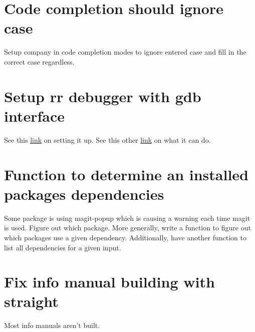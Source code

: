 \documentclass{default}
\begin{document}
\section{Code completion should ignore case}

Setup company in code completion modes to ignore entered case and fill in the correct case
regardless.

\section{Setup rr debugger with gdb interface}

See this
\href{https://emacs.stackexchange.com/questions/20056/is-it-possible-to-use-mozillas-rr-with-gdb-multi-window?rq=1}{link}
on setting it up. See this other
\href{http://fitzgeraldnick.com/2015/11/02/back-to-the-futurre.html}{link} on what it can do.

\section{Function to determine an installed packages dependencies}

Some package is using magit-popup which is causing a warning each time magit is used. Figure out
which package. More generally, write a function to figure out which packages use a given
dependency. Additionally, have another function to list all dependencies for a given input.

\section{Fix info manual building with straight}

Most info manuals aren't built.
\end{document}
